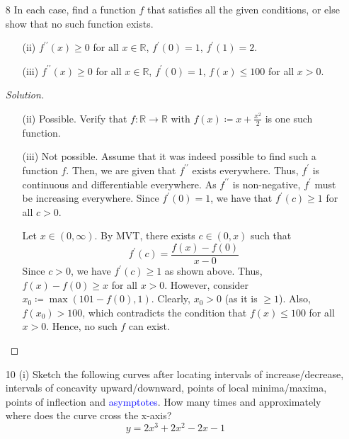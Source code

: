 \documentclass[12pt]{article}
\def\ddfrac#1#2{\displaystyle\frac{\displaystyle #1}{\displaystyle #2}}
\theoremstyle{definition}
\newenvironment{soln}{\begin{proof}[Solution]}{\end{proof}}
\begin{document}
\begin{enumerate}[leftmargin=*]
    \itemsep0.5em
    \item[8] In each case, find a function $f$ that satisfies all the given conditions, or else show that no such function exists.
    \begin{enumerate}
        \item[(ii)] $f^{\prime \prime}(x) \geq 0$ for all $x \in \mathbb{R}$, $f^{\prime}(0) = 1$, $f^{\prime}(1) = 2$.
        \item[(iii)] $f^{\prime\prime}(x) \geq 0$ for all $x \in \mathbb{R}$, $f^{\prime}(0) = 1$, $f(x) \leq 100$ for all $x>0$.
    \end{enumerate}
    
    \medskip
    
    \begin{soln}$ $\par\nobreak\ignorespaces
        \begin{enumerate}[leftmargin=*]
            \item[(ii)] Possible. Verify that $f \colon \mathbb{R} \rightarrow \mathbb{R}$ with $f(x) \coloneqq x + \ddfrac{x^2}{2}$ is one such function.
            
            \item[(iii)] Not possible. Assume that it was indeed possible to find such a function $f$. Then, we are given that $f^{\prime \prime}$ exists everywhere. Thus, $f^{\prime}$ is continuous and differentiable everywhere. As $f^{\prime \prime}$ is non-negative, $f^{\prime}$ must be increasing everywhere. Since $f^{\prime}(0) = 1$, we have that $f^{\prime}(c) \geq 1$ for all $c>0$.
            
            Let $x \in (0,\infty)$. By MVT, there exists $c \in (0,x)$ such that \[
                f^{\prime}(c) = \frac{f(x) - f(0)}{x - 0}
            \]
            Since $c>0$, we have $f^{\prime}(c) \geq 1$ as shown above. Thus, $f(x) - f(0) \geq x$ for all $x > 0$. However, consider $x_0 \coloneqq \max\left(101-f(0), 1\right)$. Clearly, $x_0 > 0$ (as it is $\geq 1$). Also, $f(x_0) > 100$, which contradicts the condition that $f(x) \leq 100$ for all $x>0$. Hence, no such $f$ can exist.
        \end{enumerate}
    \end{soln}
    
    \newpage
    
    \item[10 (i)] Sketch the following curves after locating intervals of increase/decrease, intervals of concavity upward/downward, points of local minima/maxima, points of inflection and \textcolor{blue}{asymptotes}. How many times and approximately where does the curve cross the x-axis?
    \[
        y = 2x^3 + 2x^2 - 2x - 1
    \]
    

\end{enumerate}
\end{document}
